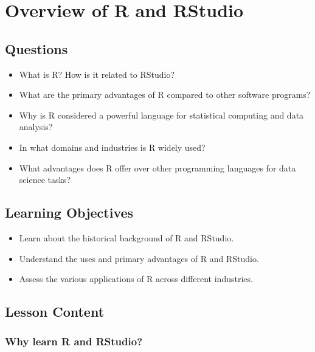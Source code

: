 \documentclass[
  letterpaper,
  DIV=11,
  numbers=noendperiod]{scrreprt}
\begin{document}
\hypertarget{sec-overview}{%
\chapter{Overview of R and RStudio}\label{sec-overview}}

\hypertarget{questions}{%
\section{Questions}\label{questions}}

\begin{itemize}
\item
  What is R? How is it related to RStudio?
\item
  What are the primary advantages of R compared to other software
  programs?
\item
  Why is R considered a powerful language for statistical computing and
  data analysis?
\item
  In what domains and industries is R widely used?
\item
  What advantages does R offer over other programming languages for data
  science tasks?
\end{itemize}

\hypertarget{learning-objectives}{%
\section{Learning Objectives}\label{learning-objectives}}

\begin{itemize}
\item
  Learn about the historical background of R and RStudio.
\item
  Understand the uses and primary advantages of R and RStudio.
\item
  Assess the various applications of R across different industries.
\end{itemize}

\hypertarget{lesson-content}{%
\section{Lesson Content}\label{lesson-content}}

\hypertarget{why-learn-r-and-rstudio}{%
\subsection{Why learn R and RStudio?}\label{why-learn-r-and-rstudio}}
\end{document}
